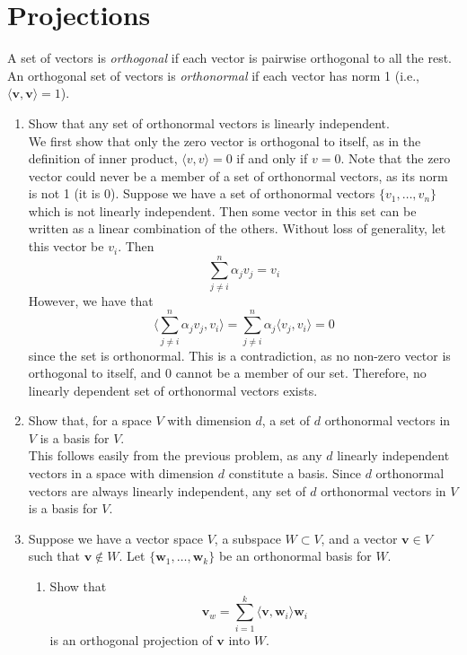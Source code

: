 \documentclass{article}
\begin{document}
\section{Projections}
A set of vectors is \textit{orthogonal} if each vector is pairwise orthogonal to all the rest. An orthogonal set of vectors is \textit{orthonormal} if each vector has norm 1 (i.e., $\langle \mathbf{v}, \mathbf{v} \rangle = 1$).
\begin{enumerate}[label=\arabic*.]
	\item Show that any set of orthonormal vectors is linearly independent. \\
	{\color{blue} We first show that only the zero vector is orthogonal to itself, as in the definition of inner product, $\langle v, v \rangle = 0$ if and only if $v = 0$. Note that the zero vector could never be a member of a set of orthonormal vectors, as its norm is not 1 (it is 0). Suppose we have a set of orthonormal vectors $\{v_1, \ldots, v_n\}$ which is not linearly independent. Then some vector in this set can be written as a linear combination of the others. Without loss of generality, let this vector be $v_i$. Then $$\sum\limits_{j \neq i}^n \alpha_jv_j = v_i$$ However, we have that $$\langle \sum\limits_{j \neq i}^n \alpha_jv_j, v_i \rangle = \sum\limits_{j \neq i}^n \alpha_j \langle v_j, v_i \rangle = 0$$ since the set is orthonormal. This is a contradiction, as no non-zero vector is orthogonal to itself, and 0 cannot be a member of our set. Therefore, no linearly dependent set of orthonormal vectors exists.}
	\item Show that, for a space $V$ with dimension $d$, a set of $d$ orthonormal vectors in $V$ is a basis for $V$. \\
	{\color{blue} This follows easily from the previous problem, as any $d$ linearly independent vectors in a space with dimension $d$ constitute a basis. Since $d$ orthonormal vectors are always linearly independent, any set of $d$ orthonormal vectors in $V$ is a basis for $V$.}
	\item Suppose we have a vector space $V$, a subspace $W \subset V$, and a vector $\mathbf{v} \in V$ such that $\mathbf{v} \notin W$. Let $\{\mathbf{w}_1, \ldots, \mathbf{w}_k\}$ be an orthonormal basis for $W$. 
	\begin{enumerate}[label=(\alph*)]
	\item Show that $$\mathbf{v}_w = \sum\limits_{i=1}^k \langle \mathbf{v}, \mathbf{w}_i \rangle\mathbf{w}_i$$ is an orthogonal projection of $\mathbf{v}$ into $W$.\\

\end{enumerate}
\end{enumerate}
\end{document}
